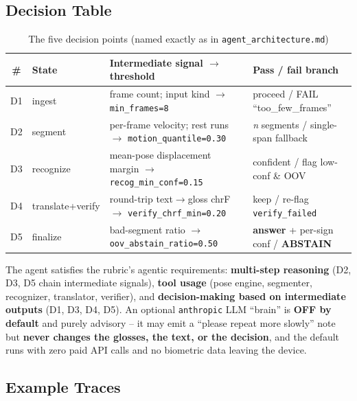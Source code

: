 \documentclass[12pt,a4paper]{article}
\begin{document}
\subsection{Decision Table}

\begin{table}[H]
\centering
\caption{The five decision points (named exactly as in \texttt{agent\_architecture.md})}
\small
\setlength{\tabcolsep}{4pt}
\begin{tabularx}{\linewidth}{@{} c l L l @{}}
\toprule
\textbf{\#} & \textbf{State} & \textbf{Intermediate signal $\rightarrow$ threshold} & \textbf{Pass / fail branch} \\
\midrule
D1 & ingest & frame count; input kind $\rightarrow$ \texttt{min\_frames=8} & proceed / FAIL ``too\_few\_frames'' \\
D2 & segment & per-frame velocity; rest runs $\rightarrow$ \texttt{motion\_quantile=0.30} & \emph{n} segments / single-span fallback \\
D3 & recognize & mean-pose displacement margin $\rightarrow$ \texttt{recog\_min\_conf=0.15} & confident / flag low-conf \& OOV \\
D4 & translate+verify & round-trip text$\rightarrow$gloss chrF $\rightarrow$ \texttt{verify\_chrf\_min=0.20} & keep / re-flag \texttt{verify\_failed} \\
D5 & finalize & bad-segment ratio $\rightarrow$ \texttt{oov\_abstain\_ratio=0.50} & \textbf{answer} + per-sign conf / \textbf{ABSTAIN} \\
\bottomrule
\end{tabularx}
\end{table}

The agent satisfies the rubric's agentic requirements: \textbf{multi-step reasoning} (D2, D3, D5 chain intermediate signals), \textbf{tool usage} (pose engine, segmenter, recognizer, translator, verifier), and \textbf{decision-making based on intermediate outputs} (D1, D3, D4, D5). An optional \texttt{anthropic} LLM ``brain'' is \textbf{OFF by default} and purely advisory -- it may emit a ``please repeat more slowly'' note but \textbf{never changes the glosses, the text, or the decision}, and the default runs with zero paid API calls and no biometric data leaving the device.

\subsection{Example Traces}
\end{document}
